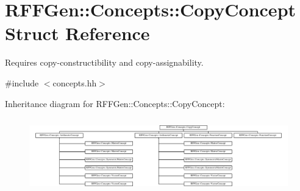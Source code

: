 \hypertarget{structRFFGen_1_1Concepts_1_1CopyConcept}{\section{R\-F\-F\-Gen\-:\-:Concepts\-:\-:Copy\-Concept Struct Reference}
\label{structRFFGen_1_1Concepts_1_1CopyConcept}
}


Requires copy-\/constructibility and copy-\/assignability.  




{\ttfamily \#include $<$concepts.\-hh$>$}

Inheritance diagram for R\-F\-F\-Gen\-:\-:Concepts\-:\-:Copy\-Concept\-:\begin{figure}[H]
\begin{center}
\leavevmode
\includegraphics[height=3.294118cm]{structRFFGen_1_1Concepts_1_1CopyConcept}
\end{center}
\end{figure}
